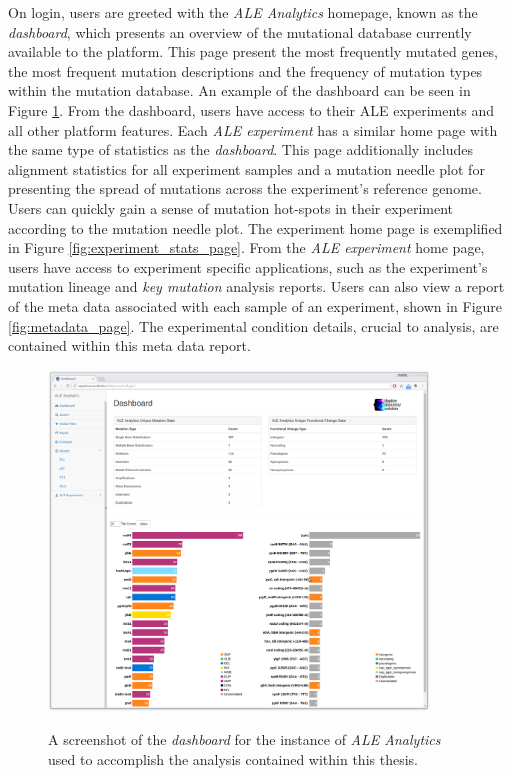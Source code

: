 \documentclass[12pt,final,masters,chapterheads]{ucsd}  %
\begin{document}
On login, users are greeted with the \textit{ALE Analytics} homepage, known as the \textit{dashboard}, which presents an overview of the mutational database currently available to the platform. This page present the most frequently mutated genes, the most frequent mutation descriptions and the frequency of mutation types within the mutation database. An example of the dashboard can be seen in Figure \ref{fig:dashboard_page}. From the dashboard, users have access to their ALE experiments and all other platform features. Each \textit{ALE experiment} has a similar home page with the same type of statistics as the \textit{dashboard}. This page additionally includes alignment statistics for all experiment samples and a mutation needle plot \cite{michael_p_schroeder_2015_14561} for presenting the spread of mutations across the experiment's reference genome. Users can quickly gain a sense of mutation hot-spots in their experiment according to the mutation needle plot. The experiment home page is exemplified in Figure \ref{fig:experiment_stats_page}. From the \textit{ALE experiment} home page, users have access to experiment specific applications, such as the experiment's mutation lineage and \textit{key mutation} analysis reports. Users can also view a report of the meta data associated with each sample of an experiment, shown in Figure \ref{fig:metadata_page}. The experimental condition details, crucial to analysis, are contained within this meta data report.
\begin{figure}[H]
  \caption{A screenshot of the \textit{dashboard} for the instance of \textit{ALE Analytics} used to accomplish the analysis contained within this thesis.}
  \centering
  \includegraphics[width=0.9\textwidth]{dashboard_page.png}
  \label{fig:dashboard_page}
\end{figure}
\end{document}
